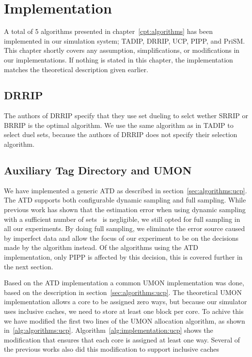 \chapter{Implementation}
\label{cpt:implementation}

A total of 5 algorithms presented in chapter~\ref{cpt:algorithms} has been implemented in our simulation system; TADIP, DRRIP, UCP, PIPP, and PriSM.
This chapter shortly covers any assumption, simplifications, or modifications in our implementations.
If nothing is stated in this chapter, the implementation matches the theoretical description given earlier.

\section{DRRIP}
The authors of DRRIP specify that they use set dueling to selct wether SRRIP or BRRIP is the optimal algorithm.
We use the same algorithm as in TADIP to select duel sets, because the authors of DRRIP does not specify their selection algorithm.

\section{Auxiliary Tag Directory and UMON}

We have implemented a generic ATD as described in section~\ref{sec:algorithms:ucp}.
The ATD supports both configurable dynamic sampling and full sampling.
While previous work has shown that the estimation error when using dynamic sampling with a sufficient number of sets~\cite{} is negligible, we still opted for full sampling in all our experiments.
By doing full sampling, we eliminate the error source caused by imperfect data and allow the focus of our experiment to be on the decisions made by the algorithm instead.
Of the algorithms using the ATD implementation, only PIPP is affected by this decision, this is covered further in the next section.

Based on the ATD implementation a common UMON implementation was done, based on the description in section~\ref{sec:algorithms:ucp}.
The theoretical UMON implementation allows a core to be assigned zero ways, but because our simulator uses inclusive caches, we need to store at least one block per core.
To achive this we have modified the first two lines of the UMON allocation algorithm, as shown in~\ref{alg:algorithms:ucp}.
Algorithm~\ref{alg:implementation:ucp} shows the modification that ensures that each core is assigned at least one way.
Several of the previous works also did this modification to support inclusive caches~\cite{Qureshi2006,Xie2009}

